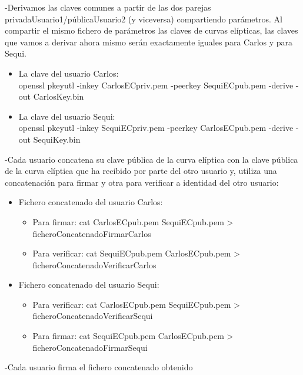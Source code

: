 -Derivamos las claves comunes a partir de las dos parejas privadaUsuario1/públicaUsuario2 (y viceversa) compartiendo parámetros.
Al compartir el mismo fichero de parámetros las claves de curvas elípticas, las claves que vamos a 
derivar ahora mismo serán exactamente iguales para Carlos y para Sequi.

\begin{itemize}
	\item La clave del usuario Carlos: \\
	
	openssl pkeyutl -inkey CarlosECpriv.pem -peerkey SequiECpub.pem -derive -out CarlosKey.bin
	
	\item La clave del usuario Sequi: \\
	
	openssl pkeyutl -inkey SequiECpriv.pem -peerkey CarlosECpub.pem -derive -out SequiKey.bin
\end{itemize}

-Cada usuario concatena su clave pública de la curva elíptica con la clave pública de la curva elíptica que ha 
recibido por parte del otro usuario y, utiliza una concatenación para firmar y otra para verificar a identidad del otro usuario:

\begin{itemize}
	\item Fichero concatenado del usuario Carlos: \\
	\begin{itemize}
		\item Para firmar: cat CarlosECpub.pem SequiECpub.pem > ficheroConcatenadoFirmarCarlos
		\item Para verificar: cat SequiECpub.pem CarlosECpub.pem > ficheroConcatenadoVerificarCarlos
	\end{itemize}
	
	\item Fichero concatenado del usuario Sequi: \\
	\begin{itemize}
		\item Para verificar: cat CarlosECpub.pem SequiECpub.pem > ficheroConcatenadoVerificarSequi
		\item Para firmar: cat SequiECpub.pem CarlosECpub.pem > ficheroConcatenadoFirmarSequi
	\end{itemize}
	
\end{itemize}

-Cada usuario firma el fichero concatenado obtenido

